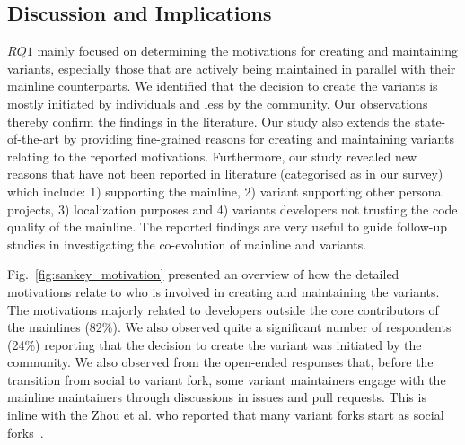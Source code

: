 \subsection{Discussion and Implications}
$RQ1$ mainly focused on determining the motivations for creating and maintaining variants, especially those that are actively being maintained in parallel with their mainline counterparts.
We identified that the decision to create the variants is mostly initiated by individuals and less by the community.
Our observations thereby confirm the findings in the literature.
Our study also extends the state-of-the-art by providing fine-grained reasons for creating and maintaining variants relating to the reported motivations.
Furthermore, our study revealed new reasons that have not been reported in literature (categorised as  in our survey) which include: 1) supporting the mainline, 2) variant supporting other personal projects, 3) localization purposes and 4) variants developers not trusting the code quality of the mainline.
The reported findings are very useful to guide follow-up studies in investigating the co-evolution of mainline and variants.

Fig.~\ref{fig:sankey_motivation} presented an overview of how the detailed motivations relate to who is involved in creating and maintaining the variants. 
The motivations majorly related to developers outside the core contributors of the mainlines  (82\%). We also observed quite a significant number of respondents (24\%) reporting that the decision to create the variant was initiated by the community. We also observed from the open-ended responses that, before the transition from social to variant fork, some variant maintainers engage with the mainline maintainers through discussions in issues and pull requests. This is inline with the Zhou et al. who reported that many variant forks start as social forks~\cite{Zhou:2020}.

